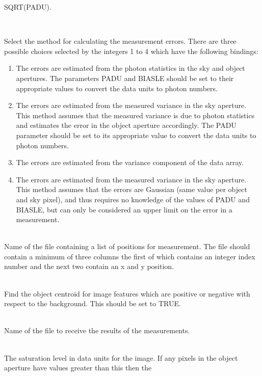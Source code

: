 \documentclass[twoside,11pt]{article}
\renewcommand{\_}{\texttt{\symbol{95}}}
\newcommand{\sstsubsection}[1]{ \item[{#1}] \mbox{} \\}
\newcommand{\sstsubsection}[1]{\item[{#1}]}
\begin{document}
{{{         SQRT(PADU).
      }
      \sstsubsection{
         PHOTON = \_INTEGER (Read)
      }{
         Select the method for calculating the measurement errors.
         There are three possible choices selected by the integers 1 to 4
         which have the following bindings:
         \begin{enumerate}
         \item The errors are estimated from the photon statistics in the
               sky and object apertures. The parameters PADU and BIASLE
               should be set to their appropriate values to convert the
               data units to photon numbers.
         \item The errors are estimated from the measured variance in the
               sky aperture. This method assumes that the measured variance
               is due to photon statistics and estimates the error in the
               object aperture accordingly. The PADU parameter should be
               set to its appropriate value to convert the data units to
               photon numbers.
         \item The errors are estimated from the variance component of the
               data array.
         \item The errors are estimated from the measured variance in the
               sky aperture. This method assumes that the errors are Gaussian
               (same value per object and sky pixel), and thus requires no
               knowledge of the values of PADU and BIASLE, but can only be
               considered an upper limit on the error in a measurement.
         \end{enumerate}
      }
      \sstsubsection{
         POSFILE = FILENAME (Read)
      }{
         Name of the file containing a list of positions for
         measurement. The file should contain a minimum of three columns
         the first of which contains an integer index number and the
         next two contain an x and y position.
      }
      \sstsubsection{
         POSITIVE = \_LOGICAL (Read)
      }{
         Find the object centroid for image features which are positive
         or negative with respect to the background. This should be set
         to TRUE.
      }
      \sstsubsection{
         RESFILE = FILENAME (Write)
      }{
         Name of the file to receive the results of the measurements.
      }
      \sstsubsection{
         SATURE = \_REAL (Read)
      }{
         The saturation level in data units for the image. If any pixels
         in the object aperture have values greater than this then the
}}}
\end{document}
